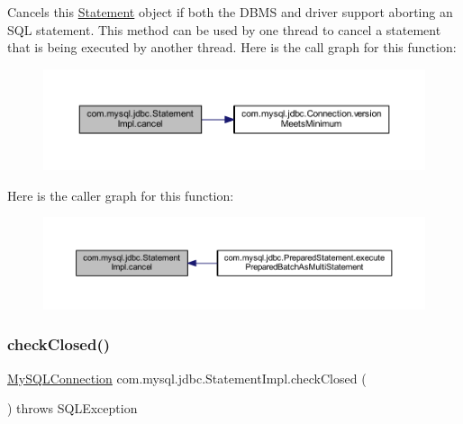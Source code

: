 Cancels this \mbox{\hyperlink{interfacecom_1_1mysql_1_1jdbc_1_1_statement}{Statement}} object if both the D\+B\+MS and driver support aborting an S\+QL statement. This method can be used by one thread to cancel a statement that is being executed by another thread. Here is the call graph for this function\+:
\nopagebreak
\begin{figure}[H]
\begin{center}
\leavevmode
\includegraphics[width=350pt]{classcom_1_1mysql_1_1jdbc_1_1_statement_impl_acbb72ce19a291352b21e798031bef18d_cgraph}
\end{center}
\end{figure}
Here is the caller graph for this function\+:
\nopagebreak
\begin{figure}[H]
\begin{center}
\leavevmode
\includegraphics[width=350pt]{classcom_1_1mysql_1_1jdbc_1_1_statement_impl_acbb72ce19a291352b21e798031bef18d_icgraph}
\end{center}
\end{figure}
\mbox{\label{classcom_1_1mysql_1_1jdbc_1_1_statement_impl_a88caedee8619aad1351c9edea352c37e}} 
\subsubsection{\texorpdfstring{check\+Closed()}{checkClosed()}}
{\footnotesize\ttfamily \mbox{\hyperlink{interfacecom_1_1mysql_1_1jdbc_1_1_my_s_q_l_connection}{My\+S\+Q\+L\+Connection}} com.\+mysql.\+jdbc.\+Statement\+Impl.\+check\+Closed (\begin{DoxyParamCaption}{ }\end{DoxyParamCaption}) throws S\+Q\+L\+Exception\hspace{0.3cm}{\ttfamily [protected]}}

